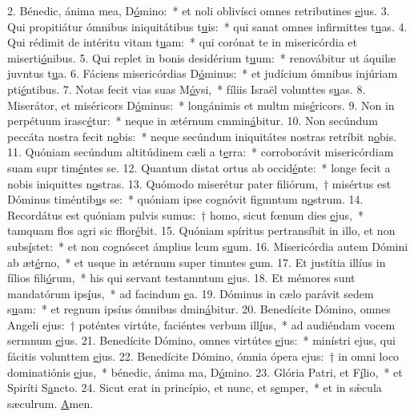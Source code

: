 2. Bénedic, ánima mea, D\uline{ó}mino:~* et noli oblivísci omnes retributines \uline{e}jus.
3. Qui propitiátur ómnibus iniquitátibus t\uline{u}is:~* qui sanat omnes infirmittes t\uline{u}as.
4. Qui rédimit de intéritu vitam t\uline{u}am:~* qui corónat te in misericórdia et miserti\uline{ó}nibus.
5. Qui replet in bonis desidérium t\uline{u}um:~* renovábitur ut áquilæ juvntus t\uline{u}a.
6. Fáciens misericórdias D\uline{ó}minus:~* et judícium ómnibus injúriam pti\uline{é}ntibus.
7. Notas fecit vias suas M\uline{ó}ysi,~* fíliis Israël volunttes s\uline{u}as.
8. Miserátor, et miséricors D\uline{ó}minus:~* longánimis et multm mis\uline{é}ricors.
9. Non in perpétuum irasc\uline{é}tur:~* neque in ætérnum cmmin\uline{á}bitur.
10. Non secúndum peccáta nostra fecit n\uline{o}bis:~* neque secúndum iniquitátes nostras retríbit n\uline{o}bis.
11. Quóniam secúndum altitúdinem cæli a t\uline{e}rra:~* corroborávit misericórdiam suam supr tim\uline{é}ntes se.
12. Quantum distat ortus ab occid\uline{é}nte:~* longe fecit a nobis iniquittes n\uline{o}stras.
13. Quómodo miserétur pater filiórum,~† misértus est Dóminus timéntib\uline{u}s se:~* quóniam ipse cognóvit figmntum n\uline{o}strum.
14. Recordátus est quóniam pulvis sumus:~† homo, sicut fœnum dies \uline{e}jus,~* tamquam flos agri sic fflor\uline{é}bit.
15. Quóniam spíritus pertransíbit in illo, et non subs\uline{í}stet:~* et non cognóscet ámplius lcum s\uline{u}um.
16. Misericórdia autem Dómini ab æt\uline{é}rno,~* et usque in ætérnum super timntes \uline{e}um.
17. Et justítia illíus in fílios fili\uline{ó}rum,~* his qui servant testamntum \uline{e}jus.
18. Et mémores sunt mandatórum ips\uline{í}us,~* ad facindum \uline{e}a.
19. Dóminus in cælo parávit sedem s\uline{u}am:~* et regnum ipsíus ómnibus dmin\uline{á}bitur.
20. Benedícite Dómino, omnes Angeli ejus:~† poténtes virtúte, faciéntes verbum ill\uline{í}us,~* ad audiéndam vocem sermnum \uline{e}jus.
21. Benedícite Dómino, omnes virtútes \uline{e}jus:~* minístri ejus, qui fácitis volunttem \uline{e}jus.
22. Benedícite Dómino, ómnia ópera ejus:~† in omni loco dominatiónis \uline{e}jus,~* bénedic, ánima ma, D\uline{ó}mino.
23. Glória Patri, et F\uline{í}lio,~* et Spiríti S\uline{a}ncto.
24. Sicut erat in princípio, et nunc, et s\uline{e}mper,~* et in sǽcula sæculrum. \uline{A}men.
